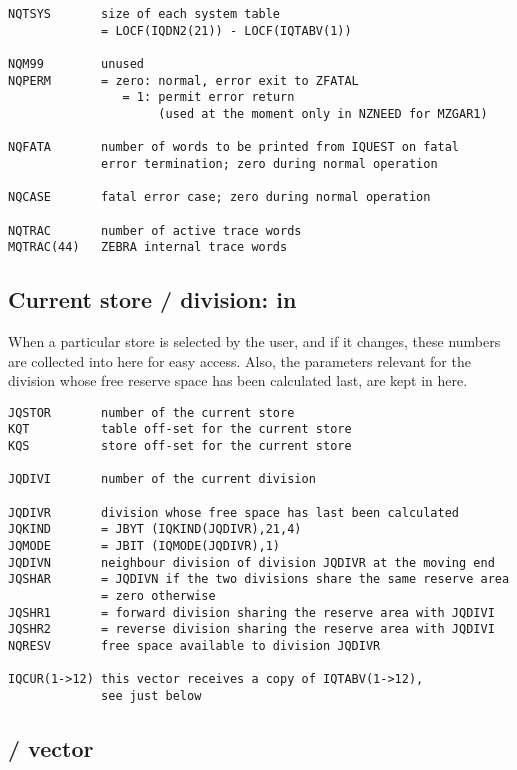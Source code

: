 \begin{verbatim}
NQTSYS       size of each system table
             = LOCF(IQDN2(21)) - LOCF(IQTABV(1))

NQM99        unused
NQPERM       = zero: normal, error exit to ZFATAL
                = 1: permit error return
                     (used at the moment only in NZNEED for MZGAR1)

NQFATA       number of words to be printed from IQUEST on fatal
             error termination; zero during normal operation

NQCASE       fatal error case; zero during normal operation

NQTRAC       number of active trace words
MQTRAC(44)   ZEBRA internal trace words
\end{verbatim} 

\subsection*{Current store / division: in }

When a particular store is selected by the user, and if it changes,
these numbers are collected into here for easy access.
Also, the parameters relevant for the division
whose free reserve space has been calculated last,
are kept in here.

\begin{verbatim}
JQSTOR       number of the current store
KQT          table off-set for the current store
KQS          store off-set for the current store

JQDIVI       number of the current division

JQDIVR       division whose free space has last been calculated
JQKIND       = JBYT (IQKIND(JQDIVR),21,4)
JQMODE       = JBIT (IQMODE(JQDIVR),1)
JQDIVN       neighbour division of division JQDIVR at the moving end
JQSHAR       = JQDIVN if the two divisions share the same reserve area
             = zero otherwise
JQSHR1       = forward division sharing the reserve area with JQDIVI
JQSHR2       = reverse division sharing the reserve area with JQDIVI
NQRESV       free space available to division JQDIVR

IQCUR(1->12) this vector receives a copy of IQTABV(1->12),
             see just below
\end{verbatim} 

\subsection*{/  vector}

